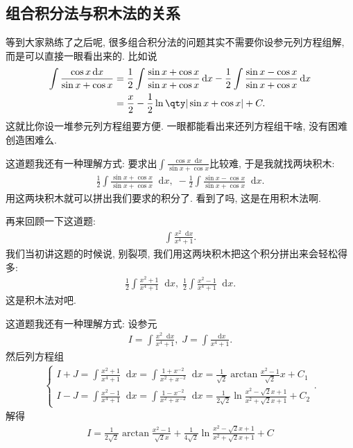 \documentclass{ctexbook}
\newcommand*{\dif}{\mathop{}\!\mathrm{d}}
\begin{document}
{\subsection{组合积分法与积木法的关系}
等到大家熟练了之后呢, 很多组合积分法的问题其实不需要你设参元列方程组解, 而是可以直接一眼看出来的. 比如说
\begin{align*}
\int\frac{\cos{x}\dif{x}}{\sin{x}+\cos{x}}={}&\frac{1}{2}\int\frac{\sin{x}+\cos{x}}{\sin{x}+\cos{x}}\dif{x}-\frac{1}{2}\int\frac{\sin{x}-\cos{x}}{\sin{x}+\cos{x}}\dif{x}\\
={}&\frac{x}{2}-\frac{1}{2}\ln\qty|\sin{x}+\cos{x}|+C
.\end{align*}
这就比你设一堆参元列方程组要方便. 一眼都能看出来还列方程组干啥, 没有困难创造困难么. \par
这道题我还有一种理解方式: 要求出$\int\frac{\cos{x}\dif{x}}{\sin{x}+\cos{x}}$比较难, 于是我就找两块积木: 
\begin{align*}
\frac{1}{2}\int\frac{\sin{x}+\cos{x}}{\sin{x}+\cos{x}}\dif{x},\;-\frac{1}{2}\int\frac{\sin{x}-\cos{x}}{\sin{x}+\cos{x}}\dif{x}
.\end{align*}
用这两块积木就可以拼出我们要求的积分了. 看到了吗, 这是在用积木法啊. \par
再来回顾一下这道题: 
\begin{align*}
\int\frac{x^{2}\dif{x}}{x^{4}+1}
.\end{align*}
我们当初讲这题的时候说, 别裂项, 我们用这两块积木把这个积分拼出来会轻松得多: 
\begin{align*}
\frac{1}{2}\int\frac{x^{2}+1}{x^{4}+1}\dif{x},\;\frac{1}{2}\int\frac{x^{2}-1}{x^{4}+1}\dif{x}
.\end{align*}
这是积木法对吧. \par
这道题我还有一种理解方式: 设参元
\begin{align*}
I=\int\frac{x^{2}\dif{x}}{x^{4}+1},\;J=\int\frac{\dif{x}}{x^{4}+1}
.\end{align*}
然后列方程组
\begin{align*}
\begin{cases}
I+J=\int\frac{x^{2}+1}{x^{4}+1}\dif{x}=\int\frac{1+x^{-2}}{x^{2}+x^{-2}}\dif{x}=\frac{1}{\sqrt{2}}\arctan{\frac{x^{2}-1}{\sqrt{2}}x}+C_{1}\\
I-J=\int\frac{x^{2}-1}{x^{4}+1}\dif{x}=\int\frac{1-x^{-2}}{x^{2}+x^{-2}}\dif{x}=\frac{1}{2\sqrt{2}}\ln{\frac{x^{2}-\sqrt{2}x+1}{x^{2}+\sqrt{2}x+1}}+C_{2}
\end{cases}
.\end{align*}
解得
\begin{align*}
I=\frac{1}{2\sqrt{2}}\arctan{\frac{x^{2}-1}{\sqrt{2}x}}+\frac{1}{4\sqrt{2}}\ln{\frac{x^{2}-\sqrt{2}x+1}{x^{2}+\sqrt{2}x+1}}+C

\end{align*}}
\end{document}
